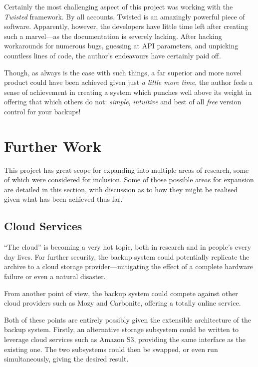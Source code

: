 Certainly the most challenging aspect of this project was working with the
\emph{Twisted} framework. By all accounts, Twisted is an amazingly powerful
piece of software. Apparently, however, the developers have little time left
after creating such a marvel---as the documentation is severely lacking. After
hacking workarounds for numerous bugs, guessing at API parameters, and
unpicking countless lines of code, the author's endeavours have certainly paid
off.

Though, as always is the case with such things, a far superior and more novel
product could have been achieved given just \emph{a little more time}, the
author feels a sense of achievement in creating a system which punches well
above its weight in offering that which others do not: \emph{simple},
\emph{intuitive} and best of all \emph{free} version control for your backups!

\section{Further Work}
\label{sec:summary-further}

This project has great scope for expanding into multiple areas of research,
some of which were considered for inclusion. Some of those possible areas for
expansion are detailed in this section, with discussion as to how they might be
realised given what has been achieved thus far.

\subsection{Cloud Services}

``The cloud'' is becoming a very hot topic, both in research and in people's
every day lives. For further security, the backup system could potentially
replicate the archive to a cloud storage provider---mitigating the effect of
a complete hardware failure or even a natural disaster.

From another point of view, the backup system could compete against other cloud
providers such as Mozy and Carbonite, offering a totally online service.

Both of these points are entirely possibly given the extensible architecture of
the backup system. Firstly, an alternative storage subsystem could be written
to leverage cloud services such as Amazon S3, providing the same interface as
the existing one. The two subsystems could then be swapped, or even run
simultaneously, giving the desired result.

